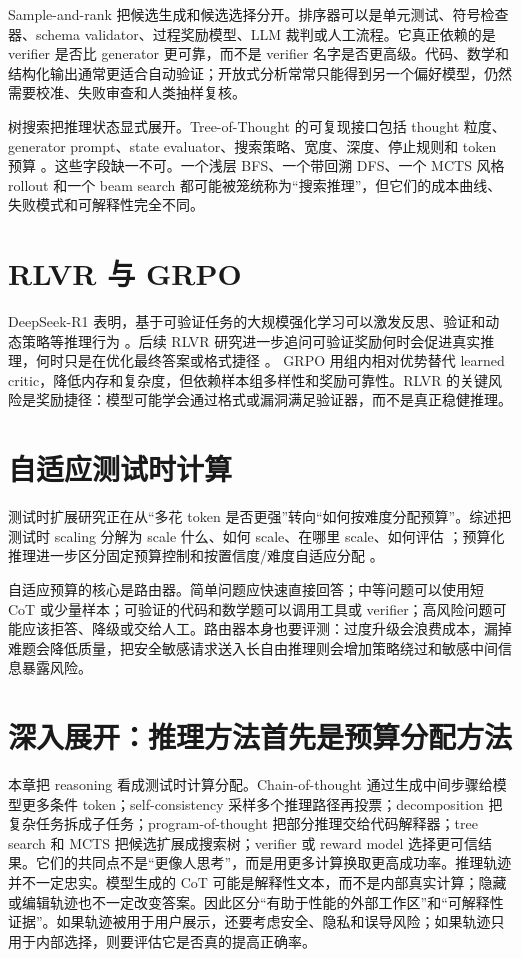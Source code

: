 \documentclass[UTF8,zihao=-4,openany]{ctexbook}
\begin{document}
Sample-and-rank 把候选生成和候选选择分开。排序器可以是单元测试、符号检查器、schema validator、过程奖励模型、LLM 裁判或人工流程。它真正依赖的是 verifier 是否比 generator 更可靠，而不是 verifier 名字是否更高级。代码、数学和结构化输出通常更适合自动验证；开放式分析常常只能得到另一个偏好模型，仍然需要校准、失败审查和人类抽样复核。

树搜索把推理状态显式展开。Tree-of-Thought 的可复现接口包括 thought 粒度、generator prompt、state evaluator、搜索策略、宽度、深度、停止规则和 token 预算 \cite{yao2023tree}。这些字段缺一不可。一个浅层 BFS、一个带回溯 DFS、一个 MCTS 风格 rollout 和一个 beam search 都可能被笼统称为“搜索推理”，但它们的成本曲线、失败模式和可解释性完全不同。

\section{RLVR 与 GRPO}
DeepSeek-R1 表明，基于可验证任务的大规模强化学习可以激发反思、验证和动态策略等推理行为 \cite{deepseek2025r1}。后续 RLVR 研究进一步追问可验证奖励何时会促进真实推理，何时只是在优化最终答案或格式捷径 \cite{wen2025rlvr}。 GRPO 用组内相对优势替代 learned critic，降低内存和复杂度，但依赖样本组多样性和奖励可靠性。RLVR 的关键风险是奖励捷径：模型可能学会通过格式或漏洞满足验证器，而不是真正稳健推理。

\section{自适应测试时计算}
测试时扩展研究正在从“多花 token 是否更强”转向“如何按难度分配预算”。综述把测试时 scaling 分解为 scale 什么、如何 scale、在哪里 scale、如何评估 \cite{zhang2025testtimescaling}；预算化推理进一步区分固定预算控制和按置信度/难度自适应分配 \cite{alomrani2025budget}。

自适应预算的核心是路由器。简单问题应快速直接回答；中等问题可以使用短 CoT 或少量样本；可验证的代码和数学题可以调用工具或 verifier；高风险问题可能应该拒答、降级或交给人工。路由器本身也要评测：过度升级会浪费成本，漏掉难题会降低质量，把安全敏感请求送入长自由推理则会增加策略绕过和敏感中间信息暴露风险。

\section{深入展开：推理方法首先是预算分配方法}
本章把 reasoning 看成测试时计算分配。Chain-of-thought 通过生成中间步骤给模型更多条件 token；self-consistency 采样多个推理路径再投票；decomposition 把复杂任务拆成子任务；program-of-thought 把部分推理交给代码解释器；tree search 和 MCTS 把候选扩展成搜索树；verifier 或 reward model 选择更可信结果。它们的共同点不是“更像人思考”，而是用更多计算换取更高成功率。推理轨迹并不一定忠实。模型生成的 CoT 可能是解释性文本，而不是内部真实计算；隐藏或编辑轨迹也不一定改变答案。因此区分“有助于性能的外部工作区”和“可解释性证据”。如果轨迹被用于用户展示，还要考虑安全、隐私和误导风险；如果轨迹只用于内部选择，则要评估它是否真的提高正确率。
\end{document}
